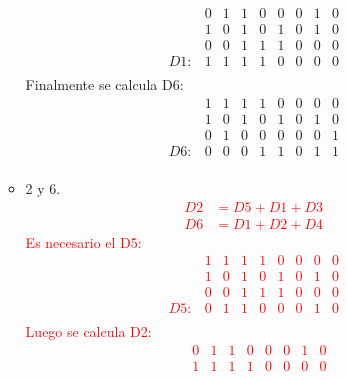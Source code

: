 \documentclass{templateNote}
\begin{document}
\begin{itemize}
\begin{itemize}
{\begin{equation*}
\begin{array}{ccccccccc}
                    & 0 & 1 & 1 & 0 & 0 & 0 & 1 & 0 \\
                    & 1 & 0 & 1 & 0 & 1 & 0 & 1 & 0 \\
                    & 0 & 0 & 1 & 1 & 1 & 0 & 0 & 0 \\ \hline
                D1: & 1 & 1 & 1 & 1 & 0 & 0 & 0 & 0 \\
                \end{array}
            \end{equation*}
            Finalmente se calcula D6:
            \begin{equation*}
                \begin{array}{ccccccccc}
                    & 1 & 1 & 1 & 1 & 0 & 0 & 0 & 0 \\
                    & 1 & 0 & 1 & 0 & 1 & 0 & 1 & 0 \\
                    & 0 & 1 & 0 & 0 & 0 & 0 & 0 & 1 \\ \hline
                D6: & 0 & 0 & 0 & 1 & 1 & 0 & 1 & 1 \\
                \end{array}
            \end{equation*}
        }
        \item 2 y 6.
        \textcolor{red}{
            \begin{align*}
                D2 &= D5 + D1 + D3 \\
                D6 &= D1 + D2 + D4
            \end{align*}
            Es necesario el D5:
            \begin{equation*}
                \begin{array}{ccccccccc}
                    & 1 & 1 & 1 & 1 & 0 & 0 & 0 & 0 \\
                    & 1 & 0 & 1 & 0 & 1 & 0 & 1 & 0 \\
                    & 0 & 0 & 1 & 1 & 1 & 0 & 0 & 0 \\ \hline
                D5: & 0 & 1 & 1 & 0 & 0 & 0 & 1 & 0 \\
                \end{array}
            \end{equation*}
            Luego se calcula D2:
            \begin{equation*}
                \begin{array}{ccccccccc}
                    & 0 & 1 & 1 & 0 & 0 & 0 & 1 & 0 \\
                    & 1 & 1 & 1 & 1 & 0 & 0 & 0 & 0 \\

\end{array}
\end{equation*}}
\end{itemize}
\end{itemize}
\end{document}
